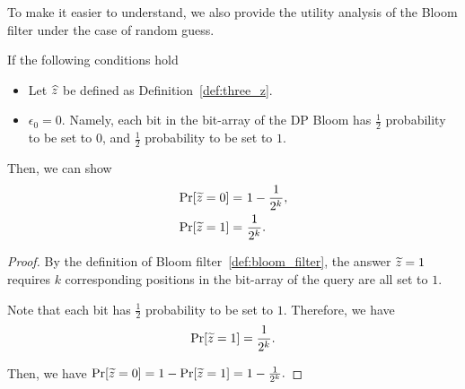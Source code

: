 To make it easier to understand, we also provide the utility analysis of the Bloom filter under the case of random guess.  

\begin{lemma}\label{lem:random_guess}
If the following conditions hold
\begin{itemize}
    \item Let $\widehat{z}$ be defined as Definition~\ref{def:three_z}.
    \item $\epsilon_0 = 0$. Namely, each bit in the bit-array of the DP Bloom has $\frac{1}{2}$ probability to be set to $0$, and  $\frac{1}{2}$ probability to be set to $1$. 
\end{itemize}

Then, we can show 
\begin{align*}
    \Pr[\widetilde{z} = 0] = & ~ 1 - \frac{1}{2^k}, \notag \\
    \Pr[\widetilde{z} = 1] = & ~ \frac{1}{2^k}.
\end{align*}
\end{lemma}

\begin{proof}
    By the definition of Bloom filter~\ref{def:bloom_filter}, the answer $\widetilde{z} = 1$ requires $k$ corresponding positions in the bit-array of the query are all set to $1$. 

    Note that each bit has $\frac{1}{2}$ probability to be set to $1$. Therefore, we have
    \begin{align*}
        \Pr[\widetilde{z} = 1] = \frac{1}{2^k} .
    \end{align*}

    Then, we have $\Pr[\widetilde{z} = 0] = 1 - \Pr[\widetilde{z} = 1] = 1 - \frac{1}{2^k}.$
\end{proof}




